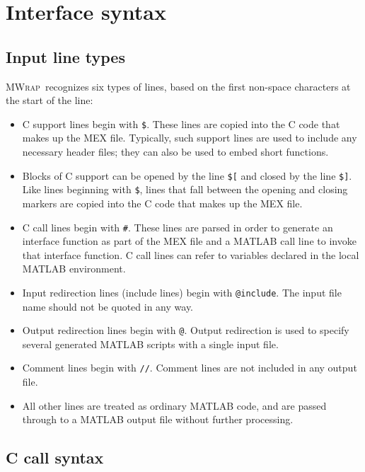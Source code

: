 \documentclass[12pt]{article}
\newcommand{\mwrap}{\textsc{MWrap}}
\begin{document}
\section{Interface syntax}


\subsection{Input line types}

\mwrap\ recognizes six types of lines, based on the first non-space
characters at the start of the line:
\begin{itemize}
\item C support lines begin with \verb|$|.  These
  lines are copied into the C code that makes up the MEX file.
  Typically, such support lines are used to include any necessary
  header files; they can also be used to embed short functions.

\item Blocks of C support can be opened by the line \verb|$[|
  and closed by the line \verb|$]|.  Like lines beginning with \verb|$|,
  lines that fall between the opening and closing markers are copied into
  the C code that makes up the MEX file.

\item C call lines begin with \verb|#|.  These lines are
  parsed in order to generate an interface function as part of the MEX
  file and a MATLAB call line to invoke that interface function.  C
  call lines can refer to variables declared in the local MATLAB
  environment.

\item Input redirection lines (include lines) begin with \verb|@include|.
  The input file name should not be quoted in any way.

\item Output redirection lines begin with \verb|@|. %
  Output redirection is used to specify several generated MATLAB
  scripts with a single input file.

\item Comment lines begin with \verb|//|.  Comment lines are not included
  in any output file.

\item All other lines are treated as ordinary MATLAB code, and are
  passed through to a MATLAB output file without further processing.

\end{itemize}


\subsection{C call syntax}
\end{document}
